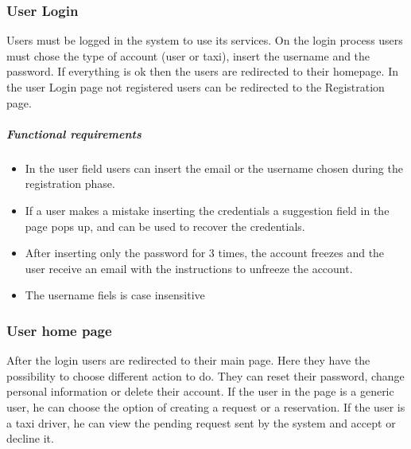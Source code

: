     
\subsubsection{User Login}
    Users must be logged in the system to use its services.
    On the login process users must chose the type of account (user or taxi), insert the username and the password. If everything is ok then the users are redirected to their homepage.
    In the user Login page not registered users can be redirected to the Registration page.
    
    \subparagraph{Functional requirements}
        \begin{itemize}
            \item In the user field users can insert the email or the username chosen during the registration phase.
            \item If a user makes a mistake inserting the credentials a suggestion field in the page pops up, and can be used to recover the credentials.
            \item After inserting only the password for 3 times, the account freezes and the user receive an email with the instructions to unfreeze the account.
            \item The username fiels is case insensitive
    
        \end{itemize}
        
\subsubsection{User home page}  
    After the login users are redirected to their main page. Here they have the possibility to choose different action to do.
    They can reset their password, change personal information or delete their account.
    If the user in the page is a generic user, he can choose the option of creating a request or a reservation.
    If the user is a taxi driver, he can view the pending request sent by the system and accept or decline it.
    
